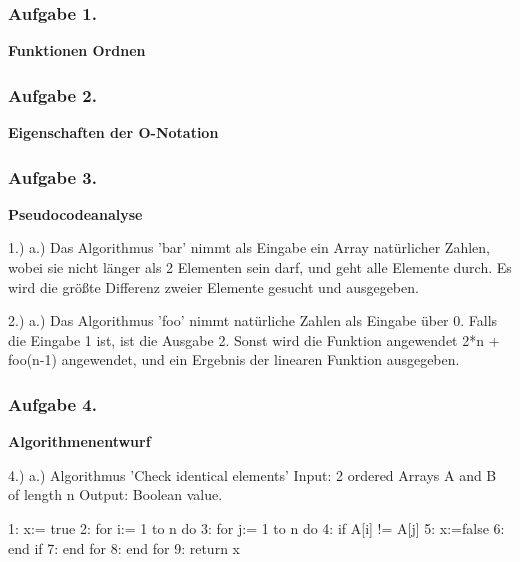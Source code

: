 \documentclass[a4paper,12pt]{article}
\newcommand{\ex}[1]{\newpage\subsubsection*{Aufgabe #1.}}
\begin{document}
	\ex{1}

	\textbf{Funktionen Ordnen}
	\begin{center}
		
	\end{center}

	\ex{2}

	\textbf{Eigenschaften der O-Notation}
	\begin{center}
		
	\end{center}

	\ex{3}

	\textbf{Pseudocodeanalyse}
	\begin{center}
		1.)
		a.)
		Das Algorithmus 'bar' nimmt als Eingabe ein Array natürlicher Zahlen, wobei sie nicht länger als 2 Elementen sein darf, und geht alle Elemente durch.
		Es wird die größte Differenz zweier Elemente gesucht und ausgegeben.
		
		2.)
		a.)
		Das Algorithmus 'foo' nimmt natürliche Zahlen als Eingabe über 0.
		Falls die Eingabe 1 ist, ist die Ausgabe 2.
		Sonst wird die Funktion angewendet 2*n + foo(n-1) angewendet, und ein Ergebnis der linearen Funktion ausgegeben.
	\end{center}

	\ex{4}

	\textbf{Algorithmenentwurf}
	\begin{center}

	4.)
	a.)
	Algorithmus 'Check identical elements'
	Input: 2 ordered Arrays A and B of length n
	Output: Boolean value.

	1:	x:= true
	2:		for i:= 1 to n do
	3:			for j:= 1 to n do
	4:			if A[i] != A[j]
	5:				x:=false
	6:			end if
	7:		end for
	8:	end for
	9:	return x
		
	\end{center}
\end{document}

